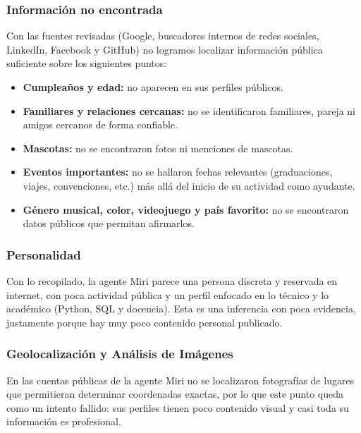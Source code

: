 \subsubsection{Información no encontrada}
Con las fuentes revisadas (Google, buscadores internos de redes sociales, LinkedIn, Facebook y GitHub) no logramos localizar información pública suficiente sobre los siguientes puntos:
\begin{itemize}
    \item \textbf{Cumpleaños y edad:} no aparecen en sus perfiles públicos.
    \item \textbf{Familiares y relaciones cercanas:} no se identificaron familiares, pareja ni amigos cercanos de forma confiable.
    \item \textbf{Mascotas:} no se encontraron fotos ni menciones de mascotas.
    \item \textbf{Eventos importantes:} no se hallaron fechas relevantes (graduaciones, viajes, convenciones, etc.) más allá del inicio de su actividad como ayudante.
    \item \textbf{Género musical, color, videojuego y país favorito:} no se encontraron datos públicos que permitan afirmarlos.
\end{itemize}

\subsubsection{Personalidad}
Con lo recopilado, la agente Miri parece una persona discreta y reservada en internet, con poca actividad pública y un perfil enfocado en lo técnico y lo académico (Python, SQL y docencia). Esta es una inferencia con poca evidencia, justamente porque hay muy poco contenido personal publicado.

\subsubsection{Geolocalización y Análisis de Imágenes}
En las cuentas públicas de la agente Miri no se localizaron fotografías de lugares que permitieran determinar coordenadas exactas, por lo que este punto queda como un intento fallido: sus perfiles tienen poco contenido visual y casi toda su información es profesional.

